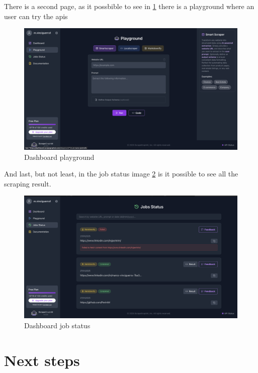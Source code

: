 There is a second page, as it possbible to see in \ref{fig:enter-dashboard-playground} there is a playground where an user can try the apis
\begin{figure}[h!]
    \centering
    \includegraphics[width=0.95\linewidth]{Assets/dashboard_2.png}
    \caption{Dashboard playground}
    \label{fig:enter-dashboard-playground}
\end{figure}

And last, but not least, in the job status image \ref{fig:enter-dashboard-status} is it possible to see all the scraping result.
\begin{figure}[h!]
    \centering
    \includegraphics[width=0.95\linewidth]{Assets/dashboard_3.png}
    \caption{Dashboard job status}
    \label{fig:enter-dashboard-status}
\end{figure}

\section{Next steps}
